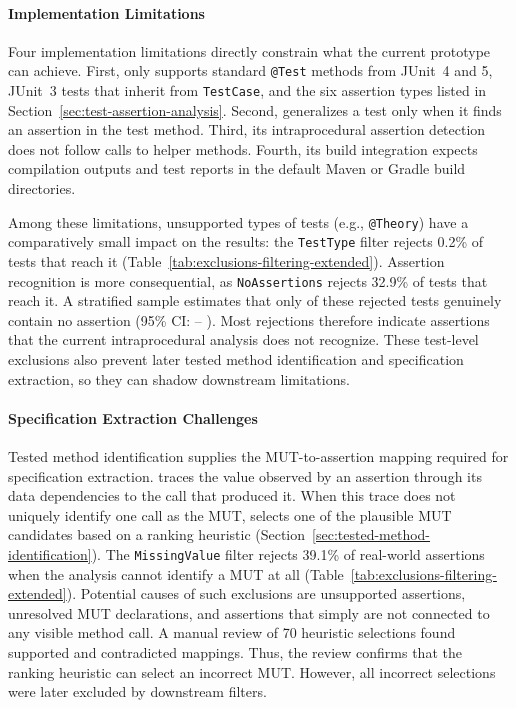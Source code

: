 \paragraph{Implementation Limitations}%
\label{par:implementation-limitations}

Four implementation limitations directly constrain what the current prototype can achieve.
First, \ToolTeralizer{} only supports standard \texttt{@Test} methods from JUnit~4 and 5,
JUnit~3 tests that inherit from \texttt{TestCase}, and the six assertion types listed in
Section~\ref{sec:test-assertion-analysis}.
Second, \ToolTeralizer{} generalizes a test only when it finds an assertion in the test method.
Third, its intraprocedural assertion detection does not follow calls to helper methods.
Fourth, its build integration expects compilation outputs and test reports in the default Maven or Gradle build directories.

Among these limitations, unsupported types of tests (e.g., \texttt{@Theory})
have a comparatively small impact on the results:
the \texttt{TestType} filter rejects 0.2\% of tests that reach it
(Table~\ref{tab:exclusions-filtering-extended}).
Assertion recognition is more consequential, as \texttt{NoAssertions} rejects 32.9\% of tests that reach it.
A stratified sample estimates that only
\TzRqsixReconstructionNoAssertionsGenuineAbsenceEstimatePct{} of these rejected tests genuinely
contain no assertion (95\% CI\@:
\TzRqsixReconstructionNoAssertionsGenuineAbsenceCiLowerPct{}--
\TzRqsixReconstructionNoAssertionsGenuineAbsenceCiUpperPct{}).
Most rejections therefore indicate assertions
that the current intraprocedural analysis does not recognize.
These test-level exclusions also prevent later tested method identification and specification
extraction, so they can shadow downstream limitations.

\paragraph{Specification Extraction Challenges}%
\label{par:specification-extraction-challenges}

Tested method identification supplies the MUT-to-assertion mapping required for specification
extraction.
\ToolTeralizer{} traces the value observed by an assertion through its data dependencies to the call
that produced it.
When this trace does not uniquely identify one call as the MUT,
\ToolTeralizer{} selects one of the plausible MUT candidates
based on a ranking heuristic (Section~\ref{sec:tested-method-identification}).
The \texttt{MissingValue} filter rejects 39.1\% of real-world assertions when the analysis cannot
identify a MUT at all (Table~\ref{tab:exclusions-filtering-extended}).
Potential causes of such exclusions are unsupported assertions,
unresolved MUT declarations, and assertions
that simply are not connected to any visible method call.
A manual review of 70 heuristic selections found \TzRqsixReconstructionAssertionToMutReviewedSupportedMapping{}
supported and \TzRqsixReconstructionAssertionToMutReviewedContradictedMapping{} contradicted mappings.
Thus, the review confirms that the ranking heuristic can select an incorrect MUT\@.
However, all incorrect selections were later excluded by downstream filters.

